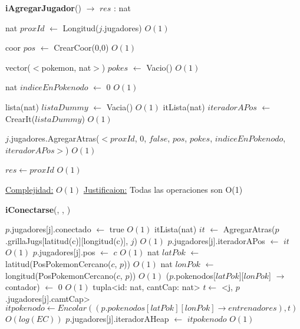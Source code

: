 \begin{Algoritmos}
\begin{algorithm}[H]
\begin{algorithmic}[1]
\end{algorithmic}
\end{algorithm}


\begin{algorithm}[H]
{\textbf{iAgregarJugador}() $\to$ $res$ : nat}
\begin{algorithmic}[1]

\State nat $proxId$ $\gets$ Longitud($j$.jugadores)   \Comment $O(1)$


\State coor $pos$ $\gets$ CrearCoor(0,0) \Comment $O(1)$

\State vector($<$pokemon, nat$>$) $pokes$ $\gets$ Vacio() \Comment $O(1)$
 
\State nat $indiceEnPokenodo$ $\gets$ 0  \Comment $O(1)$

\State lista(nat) $listaDummy$ $\gets$ Vacia() \Comment $O(1)$
\State itLista(nat) $iteradorAPos$ $\gets$ CrearIt($listaDummy$) \Comment $O(1)$

\State $j$.jugadores.AgregarAtras($<proxId$, 0, $false$, $pos$, $pokes$, $indiceEnPokenodo$, $iteradorAPos>$) \Comment $O(1)$

\State $res \gets proxId$ \Comment $O(1)$

\medskip
\State \underline{Complejidad:} $O(1)$
\State \underline{Justificaion:} Todas las operaciones son O(1)

\end{algorithmic}
\end{algorithm}

\begin{algorithm}[H]
{\textbf{iConectarse}(, , )}
\begin{algorithmic}[1]

\State $p$.jugadores[\hspace{0.5mm}j\hspace{0.5mm}].conectado $\gets$ true \Comment $O(1)$
\State itLista(nat) $it$ $\gets$ AgregarAtras($p$.grillaJugs[latitud(c)][longitud(c)], $j$) \Comment $O(1)$
\State $p$.jugadores[j].iteradorAPos $\gets$ $it$ \Comment $O(1)$
\State $p$.jugadores[j].pos $\gets$ $c$
 \Comment $O(1)$
    \State nat $latPok$ $\gets$ latitud(PosPokemonCercano($c$, $p$)) \Comment $O(1)$
    \State nat $lonPok$ $\gets$ longitud(PosPokemonCercano($c$, $p$)) \Comment $O(1)$
    \State ($p$.pokenodos[$latPok$][$lonPok$] $\rightarrow$ contador) $\gets$ 0 \Comment $O(1)$
    \State tupla<id: nat, cantCap: nat> $t \gets$ <j, $p$.jugadores[j].camtCap> 
    \State $itpokenodo \gets Encolar((p.pokenodos[latPok][lonPok] \rightarrow entrenadores) , t)$
\Comment $O(log(EC))$
    \State $p$.jugadores[j].iteradorAHeap $\gets$ $itpokenodo$ \Comment $O(1)$
\EndIf


\end{algorithmic}
\end{algorithm}
\end{Algoritmos}
